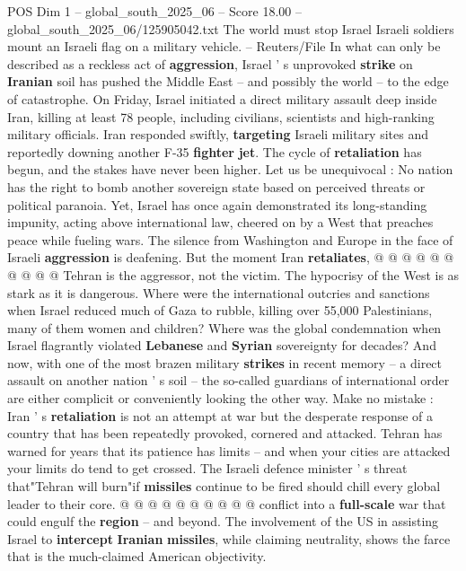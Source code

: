 \begin{textsample}{POS Dim 1 – global\_south\_2025\_06 – Score 18.00 – global\_south\_2025\_06/125905042.txt}  \label{ex:f1_pos_218}
The world must stop Israel Israeli soldiers mount an Israeli flag on a military vehicle. -- Reuters/File In what can only be described as a reckless act of \textbf{aggression}, Israel ' s unprovoked \textbf{strike} on \textbf{Iranian} soil has pushed the Middle East -- and possibly the world -- to the edge of catastrophe.
On Friday, Israel initiated a direct military assault deep inside Iran, killing at least 78 people, including civilians, scientists and high-ranking military officials.
Iran responded swiftly, \textbf{targeting} Israeli military sites and reportedly downing another F-35 \textbf{fighter} \textbf{jet}.
The cycle of \textbf{retaliation} has begun, and the stakes have never been higher.
Let us be unequivocal : No nation has the right to bomb another sovereign state based on perceived threats or political paranoia.
Yet, Israel has once again demonstrated its long-standing impunity, acting above international law, cheered on by a West that preaches peace while fueling wars.
The silence from Washington and Europe in the face of Israeli \textbf{aggression} is deafening.
But the moment Iran \textbf{retaliates}, @ @ @ @ @ @ @ @ @ @ Tehran is the aggressor, not the victim.
The hypocrisy of the West is as stark as it is dangerous.
Where were the international outcries and sanctions when Israel reduced much of Gaza to rubble, killing over 55,000 Palestinians, many of them women and children?
Where was the global condemnation when Israel flagrantly violated \textbf{Lebanese} and \textbf{Syrian} sovereignty for decades?
And now, with one of the most brazen military \textbf{strikes} in recent memory -- a direct assault on another nation ' s soil -- the so-called guardians of international order are either complicit or conveniently looking the other way.
Make no mistake : Iran ' s \textbf{retaliation} is not an attempt at war but the desperate response of a country that has been repeatedly provoked, cornered and attacked.
Tehran has warned for years that its patience has limits -- and when your cities are attacked your limits do tend to get crossed.
The Israeli defence minister ' s threat that"Tehran will burn"if \textbf{missiles} continue to be fired should chill every global leader to their core. @ @ @ @ @ @ @ @ @ @ conflict into a \textbf{full-scale} war that could engulf the \textbf{region} -- and beyond.
The involvement of the US in assisting Israel to \textbf{intercept} \textbf{Iranian} \textbf{missiles}, while claiming neutrality, shows the farce that is the much-claimed American objectivity.

\end{textsample}
